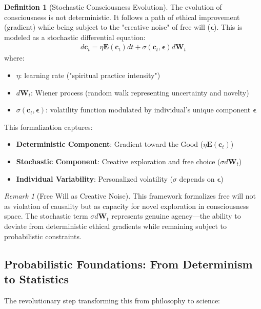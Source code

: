 \documentclass[11pt,a4paper]{article}
\theoremstyle{definition}
\newtheorem{definition}{Definition}[section]
\theoremstyle{remark}
\newtheorem{remark}{Remark}[section]
\newcommand{\EE}{\mathbf{E}}
\newcommand{\cc}{\mathbf{c}}
\begin{document}
\begin{definition}[Stochastic Consciousness Evolution]
The evolution of consciousness is not deterministic. It follows a path of ethical improvement (gradient) while being subject to the "creative noise" of free will (\(\boldsymbol{\epsilon}\)). This is modeled as a stochastic differential equation:
\begin{align}
d\cc_t = \eta \EE(\cc_t) dt + \sigma(\cc_t, \boldsymbol{\epsilon}) d\mathbf{W}_t
\end{align}
where:
\begin{itemize}
\item \(\eta\): learning rate ("spiritual practice intensity")
\item \(d\mathbf{W}_t\): Wiener process (random walk representing uncertainty and novelty)
\item \(\sigma(\cc_t, \boldsymbol{\epsilon})\): volatility function modulated by individual's unique component \(\boldsymbol{\epsilon}\)
\end{itemize}
\end{definition}

This formalization captures:
\begin{itemize}
\item \textbf{Deterministic Component}: Gradient toward the Good (\(\eta \EE(\cc_t)\))
\item \textbf{Stochastic Component}: Creative exploration and free choice (\(\sigma d\mathbf{W}_t\))
\item \textbf{Individual Variability}: Personalized volatility (\(\sigma\) depends on \(\boldsymbol{\epsilon}\))
\end{itemize}

\begin{remark}[Free Will as Creative Noise]
This framework formalizes free will not as violation of causality but as capacity for novel exploration in consciousness space. The stochastic term \(\sigma d\mathbf{W}_t\) represents genuine agency—the ability to deviate from deterministic ethical gradients while remaining subject to probabilistic constraints.
\end{remark}

\subsection{Probabilistic Foundations: From Determinism to Statistics}

The revolutionary step transforming this from philosophy to science:
\end{document}

